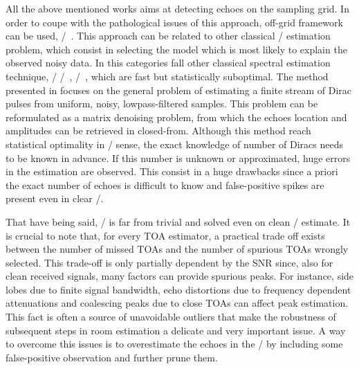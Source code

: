 \mynewline
All the above mentioned works aims at detecting echoes on the sampling grid.
In order to coupe with the pathological issues of this approach, off-grid framework can be used, \eg/~.
This approach can be related to other classical \ML/ estimation problem, which consist in selecting the model which is most likely to explain the observed noisy data.
In this categories fall other classical spectral estimation technique, \eg/ \MUSIC/~, \ESPRIT/~, which are fast but statistically suboptimal.
The method presented in  focuses on the general problem of estimating a finite stream of Dirac pulses from uniform, noisy, lowpass-filtered samples.
This problem can be reformulated as a matrix denoising problem, from which the echoes location and amplitudes can be retrieved in closed-from.
Although this method reach statistical optimality in \ML/ sense, the exact knowledge of number of Diracs needs to be known in advance.
If this number is unknown or approximated, huge errors in the estimation are observed.
This consist in a huge drawbacks since a priori the exact number of echoes is difficult to know and false-positive spikes are present even in clear \RIRs/.

\mynewline
That have being said, \AER/ is far from trivial and solved even on clean \RIR/ estimate.
It is crucial to note that, for every TOA estimator, a practical trade off exists between the number of missed TOAs and the number of spurious TOAs wrongly selected.
This trade-off is only partially dependent by the SNR since, also for clean received signals, many factors can provide spurious peaks.
For instance, side lobes due to finite signal bandwidth, echo distortions due to frequency dependent attenuations and coalescing peaks due to close TOAs can affect peak estimation.
This fact is often a source of unavoidable outliers that make the robustness of subsequent steps in room estimation a delicate and very important issue.
A way to overcome this issues is to overestimate the echoes in the \RIR/ by including some false-positive observation and further prune them.

